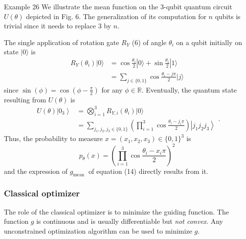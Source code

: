 \begin{example}
    Example 26 We illustrate the mean function on the 3-qubit quantum circuit $U(\theta)$ depicted in Fig. 6. The generalization of its computation for $n$ qubits is trivial since it needs to replace 3 by $n$. 
    
The single application of rotation gate $R_{Y}$ (6) of angle $\theta_{i}$ on a qubit initially on state $|0\rangle$ is
$$
\begin{aligned}
R_{Y}\left(\theta_{i}\right)|0\rangle & =\cos \frac{\theta_{i}}{2}|0\rangle+\sin \frac{\theta_{i}}{2}|1\rangle \\
& =\sum_{j \in\{0,1\}} \cos \frac{\theta_{i}-j \pi}{2}|j\rangle
\end{aligned}
$$
since $\sin (\phi)=\cos \left(\phi-\frac{\pi}{2}\right)$ for any $\phi \in \mathbb{R}$. Eventually, the quantum state resulting from $U(\theta)$ is
$$
\begin{aligned}
U(\theta)\left|0_{3}\right\rangle & =\bigotimes_{i=1}^{3} R_{Y, i}\left(\theta_{i}\right)|0\rangle \\
& =\sum_{j_{1}, j_{2}, j_{3} \in\{0,1\}}\left(\prod_{i=1}^{3} \cos \frac{\theta_{i}-j_{i} \pi}{2}\right)\left|j_{1} j_{2} j_{3}\right\rangle
\end{aligned}.
$$
Thus, the probability to measure $x=\left(x_{1}, x_{2}, x_{3}\right) \in\{0,1\}^{3}$ is
\begin{equation*}
p_{\theta}(x)=\left(\prod_{i=1}^{3} \cos \frac{\theta_{i}-x_{i} \pi}{2}\right)^{2} \tag{15}
\end{equation*}
and the expression of $g_{\text {mean }}$ of equation (14) directly results from it.
\end{example}



\subsubsection{Classical optimizer} %

The role of the classical optimizer is to minimize the guiding function. The function $g$ is continuous and is usually differentiable but \textit{not convex}. Any unconstrained optimization algorithm can be used to minimize $g$.

